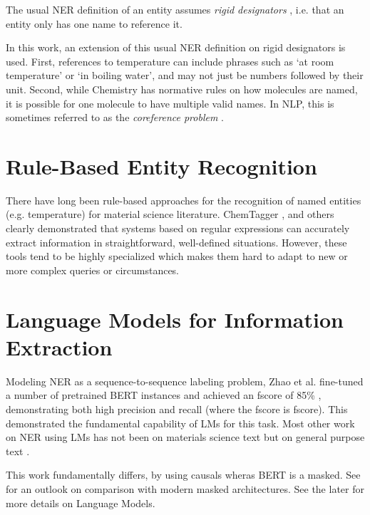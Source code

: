 The usual \gls{NER} definition of an entity assumes \textit{rigid designators} \cite{laporte_rigid_2022}, i.e. that an entity only has one name to reference it.

In this work, an extension of this usual \gls{NER} definition on rigid designators is used.
First, references to temperature can include phrases such as `at room temperature' or `in boiling water', and may not just be numbers followed by their unit.
Second, while Chemistry has normative rules on how molecules are named, it is possible for one molecule to have multiple valid names.
In \gls{NLP}, this is sometimes referred to as the \textit{coreference problem} \cite{hobbs_coherence_1979}.



\section{Rule-Based Entity Recognition}\label{sec:rule-based}
There have long been rule-based approaches for the recognition of named entities (e.g. temperature) for material science literature.
ChemTagger \cite{hawizy_chemicaltagger_2011}, and others \cite{beard_comparative_2019, huang_database_2020}
clearly demonstrated that systems based on regular expressions can accurately extract information in straightforward, well-defined situations.
However, these tools tend to be highly specialized which makes them hard to adapt to new or more complex queries or circumstances.


\section{Language Models for Information Extraction}\label{sec:lmie}
Modeling \gls{NER} as a sequence-to-sequence labeling problem, Zhao et al. fine-tuned a number of pretrained \gls{BERT} instances and achieved an \gls{fscore} of 85\% \cite{zhao_finetuning_2021}, demonstrating both high precision and recall (where the \gls{fscore} is \glsdesc{fscore}).
This demonstrated the fundamental capability of \glspl{LM} for this task.
Most other work on \gls{NER} using \glspl{LM} has not been on materials science text but on general purpose text \cite{li_survey_2022}.

This work fundamentally differs, by using \glspl{causal} wheras \gls{BERT} is a \gls{masked}. See  for an outlook on comparison with modern \gls{masked} architectures. See the later  for more details on Language Models.


